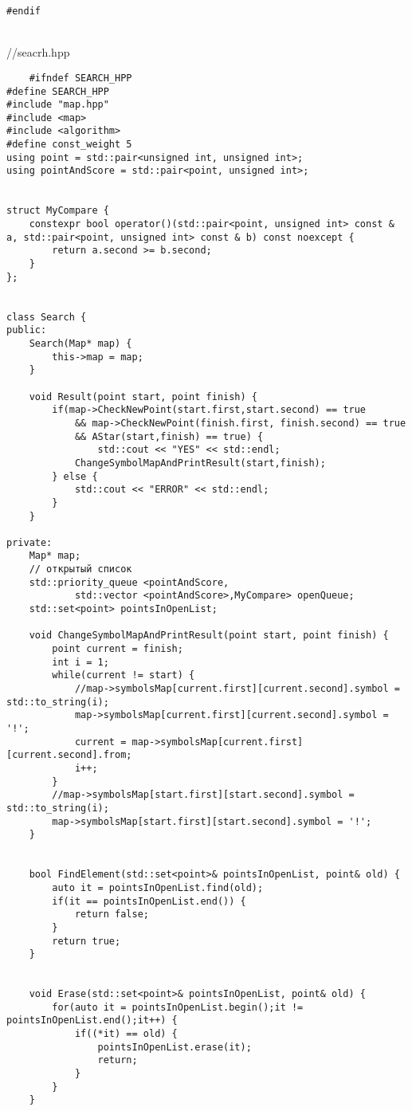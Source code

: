 \documentclass[12pt]{article}
\begin{document}
\begin{verbatim}
#endif
\end{verbatim}
\\
//seacrh.hpp
\begin{verbatim}
    #ifndef SEARCH_HPP
#define SEARCH_HPP
#include "map.hpp"
#include <map>
#include <algorithm>
#define const_weight 5 
using point = std::pair<unsigned int, unsigned int>;
using pointAndScore = std::pair<point, unsigned int>;


struct MyCompare {
    constexpr bool operator()(std::pair<point, unsigned int> const & a, std::pair<point, unsigned int> const & b) const noexcept {
        return a.second >= b.second;
    }
};


class Search {
public:
    Search(Map* map) {
        this->map = map;
    }

    void Result(point start, point finish) {
        if(map->CheckNewPoint(start.first,start.second) == true
            && map->CheckNewPoint(finish.first, finish.second) == true
            && AStar(start,finish) == true) {
                std::cout << "YES" << std::endl;
            ChangeSymbolMapAndPrintResult(start,finish);
        } else {
            std::cout << "ERROR" << std::endl;
        }
    }

private:
    Map* map;
    // открытый список
    std::priority_queue <pointAndScore,
            std::vector <pointAndScore>,MyCompare> openQueue;
    std::set<point> pointsInOpenList;

    void ChangeSymbolMapAndPrintResult(point start, point finish) {
        point current = finish;
        int i = 1;
        while(current != start) {
            //map->symbolsMap[current.first][current.second].symbol = std::to_string(i);
            map->symbolsMap[current.first][current.second].symbol = '!';
            current = map->symbolsMap[current.first][current.second].from;
            i++;
        }
        //map->symbolsMap[start.first][start.second].symbol = std::to_string(i);
        map->symbolsMap[start.first][start.second].symbol = '!';
    }


    bool FindElement(std::set<point>& pointsInOpenList, point& old) {
        auto it = pointsInOpenList.find(old);
        if(it == pointsInOpenList.end()) {
            return false;
        }
        return true;
    }


    void Erase(std::set<point>& pointsInOpenList, point& old) {
        for(auto it = pointsInOpenList.begin();it != pointsInOpenList.end();it++) {
            if((*it) == old) {
                pointsInOpenList.erase(it);
                return;
            }
        }
    }



\end{verbatim}
\end{document}
